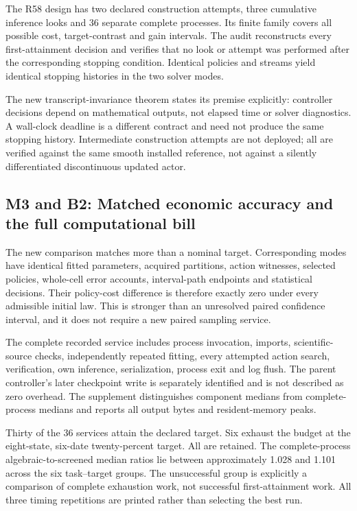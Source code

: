\documentclass[ecta,nameyear,draft]{econsocart}
\begin{document}
The R58 design has two declared construction attempts, three cumulative
inference looks and 36 separate complete processes. Its finite family
covers all possible cost, target-contrast and gain intervals. The audit
reconstructs every first-attainment decision and verifies that no look
or attempt was performed after the corresponding stopping condition.
Identical policies and streams yield identical stopping histories in the
two solver modes.

The new transcript-invariance theorem states its premise explicitly:
controller decisions depend on mathematical outputs, not elapsed time or
solver diagnostics. A wall-clock deadline is a different contract and
need not produce the same stopping history. Intermediate construction
attempts are not deployed; all are verified against the same smooth
installed reference, not against a silently differentiated discontinuous
updated actor.

\hypertarget{m3-and-b2-matched-economic-accuracy-and-the-full-computational-bill}{%
\subsection{M3 and B2: Matched economic accuracy and the full
computational
bill}\label{m3-and-b2-matched-economic-accuracy-and-the-full-computational-bill}}

The new comparison matches more than a nominal target. Corresponding
modes have identical fitted parameters, acquired partitions, action
witnesses, selected policies, whole-cell error accounts, interval-path
endpoints and statistical decisions. Their policy-cost difference is
therefore exactly zero under every admissible initial law. This is
stronger than an unresolved paired confidence interval, and it does not
require a new paired sampling service.

The complete recorded service includes process invocation, imports,
scientific-source checks, independently repeated fitting, every
attempted action search, verification, own inference, serialization,
process exit and log flush. The parent controller's later checkpoint
write is separately identified and is not described as zero overhead.
The supplement distinguishes component medians from complete-process
medians and reports all output bytes and resident-memory peaks.

Thirty of the 36 services attain the declared target. Six exhaust the
budget at the eight-state, six-date twenty-percent target. All are
retained. The complete-process algebraic-to-screened median ratios lie
between approximately 1.028 and 1.101 across the six task--target
groups. The unsuccessful group is explicitly a comparison of complete
exhaustion work, not successful first-attainment work. All three timing
repetitions are printed rather than selecting the best run.
\end{document}
